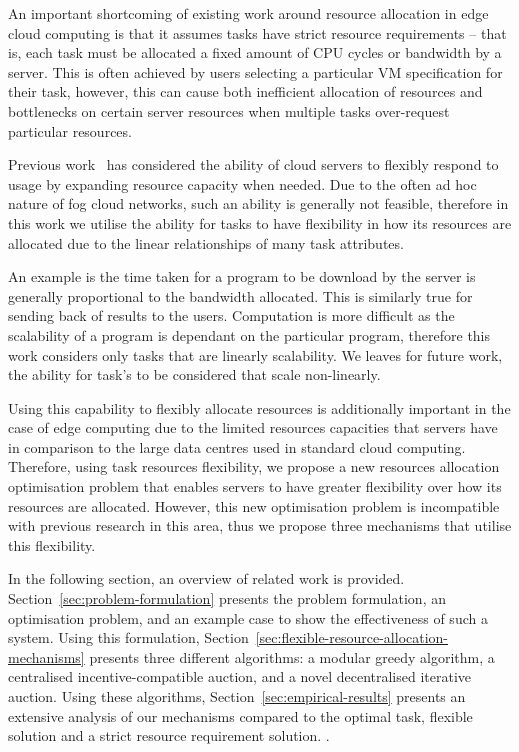 An important shortcoming of existing work around resource allocation in edge cloud computing is that it assumes tasks
have strict resource requirements -- that is, each task must be allocated a fixed amount of CPU cycles or bandwidth by a
server. This is often achieved by users selecting a particular VM specification for their task, however, this can cause
both inefficient allocation of resources and bottlenecks on certain server resources when multiple tasks over-request
particular resources.

Previous work~\cite{ServerElasticity} has considered the ability of cloud servers to flexibly respond to usage by
expanding resource capacity when needed. Due to the often ad hoc nature of fog cloud networks, such an ability is
generally not feasible, therefore in this work we utilise the ability for tasks to have flexibility in how its
resources are allocated due to the linear relationships of many task attributes.

An example is the time taken for a program to be download by the server is
generally proportional to the bandwidth allocated. This is similarly true for sending back of results to the users.
Computation is more difficult as the scalability of a program is dependant on the particular program, therefore this
work considers only tasks that are linearly scalability. We leaves for future work, the ability for task's to be
considered that scale non-linearly.

Using this capability to flexibly allocate resources is additionally important in the case of edge computing due to the
limited resources capacities that servers have in comparison to the large data centres used in standard cloud computing.
Therefore, using task resources flexibility, we propose a new resources allocation optimisation problem that enables
servers to have greater flexibility over how its resources are allocated. However, this new optimisation problem is
incompatible with previous research in this area, thus we propose three mechanisms that utilise this flexibility.

In the following section, an overview of related work is provided. Section~\ref{sec:problem-formulation} presents the
problem formulation, an optimisation problem, and an example case to show the effectiveness of such a system. Using this
formulation, Section~\ref{sec:flexible-resource-allocation-mechanisms} presents three different algorithms: a modular
greedy algorithm, a centralised incentive-compatible auction, and a novel decentralised iterative auction. Using these
algorithms, Section~\ref{sec:empirical-results} presents an extensive analysis of our mechanisms compared to the optimal
task, flexible solution and a strict resource requirement solution. .
